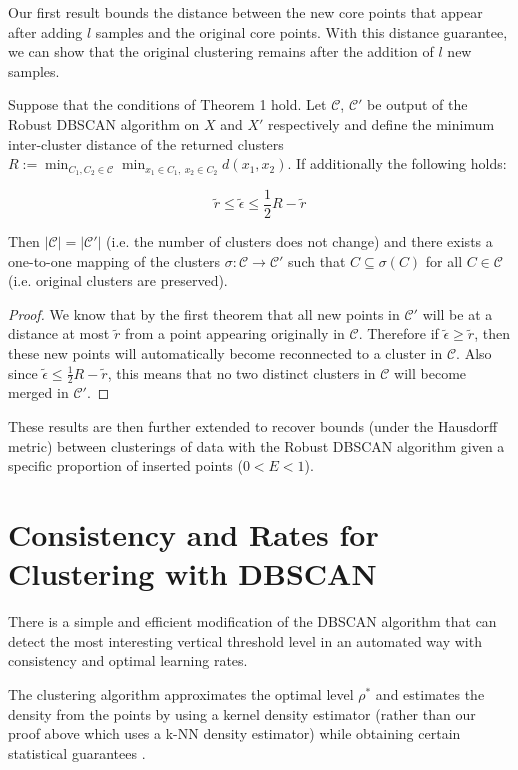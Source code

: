 Our first result bounds the distance between the new core points that appear after adding $l$ samples and the original core points. With this distance guarantee, we can show that the original clustering remains after the addition of $l$ new samples.

\begin{theorem}
Suppose that the conditions of Theorem 1 hold. Let $\mathcal{C}$, $\mathcal{C'}$ be output of the Robust DBSCAN algorithm on $X$ and $X'$ respectively and define the minimum inter-cluster distance of the returned clusters $R:=\min_{C_1,C_2 \in \mathcal{C}} \min_{x_1 \in C_1, \: x_2 \in C_2} d(x_1,x_2)$. If additionally the following holds:

\begin{equation*}
    \tilde{r}\leq \tilde{\epsilon}\leq \frac{1}{2}R-\tilde{r}
\end{equation*}

Then $|\mathcal{C}|=|\mathcal{C'}|$ (i.e. the number of clusters does not change) and there exists a one-to-one mapping of the clusters $\sigma: \mathcal{C} \rightarrow \mathcal{C'}$ such that $C\subseteq \sigma(C)$ for all $C\in \mathcal{C}$ (i.e. original clusters are preserved).
\end{theorem}

\begin{proof}
We know that by the first theorem that all new points in $\mathcal{C}'$ will be at a distance at most $\tilde{r}$ from a point appearing originally in $\mathcal{C}$. Therefore if $\tilde{\epsilon}\geq\tilde{r}$, then these new points will automatically become reconnected to a cluster in $\mathcal{C}$. Also since $\tilde{\epsilon}\leq\frac{1}{2}R-\tilde{r}$, this means that no two distinct clusters in $\mathcal{C}$ will become merged in $\mathcal{C}'$.
\end{proof}

These results are then further extended to recover bounds (under the Hausdorff metric) between clusterings of data with the Robust DBSCAN algorithm given a specific proportion of inserted points ($0<E<1$).

\section{Consistency and Rates for Clustering with DBSCAN}

There is a simple and efficient modification of the DBSCAN algorithm that can detect the most interesting vertical threshold level in an automated way with consistency and optimal learning rates.

The clustering algorithm approximates the optimal level $\rho^*$ and estimates the density from the points by using a kernel density estimator (rather than our proof above which uses a k-NN density estimator) while obtaining certain statistical guarantees \cite{pmlr-v22-sriperumbudur12}.
